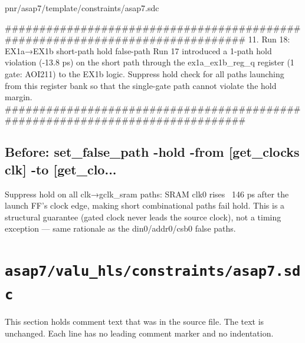\begin{relocated}{pnr/asap7/template/constraints/asap7.sdc}
\begin{textblock}
##############################################################################
11. Run 18: EX1a→EX1b short-path hold false-path
Run 17 introduced a 1-path hold violation (-13.8 ps) on the short path
through the ex1a_ex1b_reg_q register (1 gate: AOI211) to the EX1b logic.
Suppress hold check for all paths launching from this register bank so
that the single-gate path cannot violate the hold margin.
##############################################################################
\end{textblock}

\subsection*{Before: set\_false\_path -hold -from [get\_clocks clk] -to [get\_clo...}

\begin{textblock}
Suppress hold on all clk→gclk_sram paths: SRAM clk0 rises ~146 ps after
the launch FF's clock edge, making short combinational paths fail hold.
This is a structural guarantee (gated clock never leads the source clock),
not a timing exception — same rationale as the din0/addr0/csb0 false paths.
\end{textblock}

\end{relocated}

\section{\texttt{asap7/valu\_hls/constraints/asap7.sdc}}\label{tm:pd:asap7-valu-hls-sdc}

This section holds comment text that was in the source file. The text is unchanged. Each line has no leading comment marker and no indentation.

